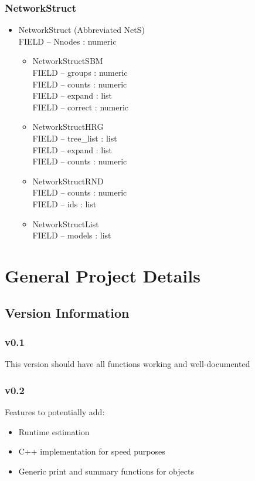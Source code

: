 \documentclass[11pt]{article}
\begin{document}
\subsubsection{NetworkStruct}
\begin{itemize}

\item NetworkStruct (Abbreviated NetS)\\
FIELD -- Nnodes : numeric
\begin{itemize}
\item NetworkStructSBM\\
FIELD -- groups : numeric\\
FIELD -- counts : numeric\\
FIELD -- expand : list\\
FIELD -- correct : numeric\\
\item NetworkStructHRG\\
FIELD -- tree\_list : list\\
FIELD -- expand : list\\
FIELD -- counts : numeric\\
\item NetworkStructRND\\
FIELD -- counts : numeric\\
FIELD -- ids : list\\
\item NetworkStructList\\
FIELD -- models : list\\
\end{itemize}
\end{itemize}









\pagebreak
\section{General Project Details}
\subsection{Version Information}
\subsubsection{v0.1}
This version should have all functions working and well-documented

\subsubsection{v0.2}
Features to potentially add: 
\begin{itemize}
\item Runtime estimation
\item C++ implementation for speed purposes
\item Generic print and summary functions for objects
\end{itemize}
\end{document}
